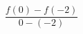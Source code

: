 \documentclass[preview]{standalone}
\begin{document}
\begin{align*}
\dfrac{f(0) - f(-2)}{0 - (-2)}
\end{align*}
\end{document}
